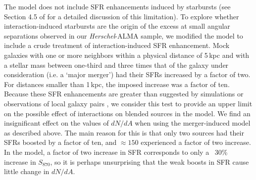 \documentclass[iop]{emulateapj}
\begin{document}

The \citet{HB13} model does not include SFR enhancements induced by starbursts
(see Section 4.5 of \citealt{HB13} for a detailed discussion of this
limitation). To explore whether interaction-induced starbursts are the origin
of the excess at small angular separations observed in our {\it Herschel}-ALMA
sample, we modified the \citet{HB13} model to include a crude treatment of
interaction-induced SFR enhancement. Mock galaxies with one or more neighbors
within a physical distance of 5$\,$kpc and with a stellar mass between
one-third and three times that of the galaxy under consideration (i.e.  a
`major merger') had their SFRs increased by a factor of two. For distances
smaller than 1$\,$kpc, the imposed increase was a factor of ten.  Because these
SFR enhancements are greater than suggested by simulations
\citep[e.g.][]{Cox08, H11, H14, Torrey12} or observations of local galaxy pairs
\citep[e.g.][]{Scudder12, Patton13}, we consider this test to provide an upper
limit on the possible effect of interactions on blended sources in the
\citet{HB13} model.  We find an insignificant effect on the values of $dN/dA$
when using the merger-induced model as described above.  The main reason for
this is that only two sources had their SFRs boosted by a factor of ten, and
$\approx150$ experienced a factor of two increase. In the \citet{HB13} model, a
factor of two increase in SFR corresponds to only a ~30\% increase in
$S_{870}$, so it is perhaps unsurprising that the weak boosts in SFR cause
little change in $dN/dA$.
\end{document}
